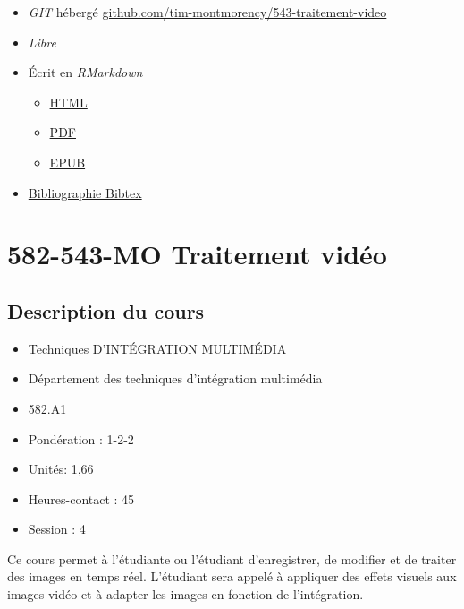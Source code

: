 \documentclass[
]{book}
\providecommand{\tightlist}{%
  \setlength{\itemsep}{0pt}\setlength{\parskip}{0pt}}
\begin{document}
\begin{itemize}
\tightlist
\item
  \emph{GIT}\citep{torvalds_Git_2006} hébergé \href{https://github.com/tim-montmorency/543-traitement-video}{github.com/tim-montmorency/543-traitement-video}
\item
  \emph{Libre}\citep{stallman_GnuOrg_1983}
\item
  Écrit en \emph{RMarkdown}\citep{allaire_RmarkdownDynamicDocuments_2020}

  \begin{itemize}
  \tightlist
  \item
    \href{https://tim-montmorency.com/543-traitement-video/}{HTML}
  \item
    \href{https://tim-montmorency.com/543-traitement-video/traitement-video.pdf}{PDF}
  \item
    \href{https://tim-montmorency.com/543-traitement-video/traitement-video.epub}{EPUB}
  \end{itemize}
\item
  \href{https://github.com/tim-montmorency/543-traitement-video/blob/master/582543-traitement-video.bib}{Bibliographie Bibtex}
\end{itemize}

\hypertarget{mo-traitement-viduxe9o}{%
\chapter{582-543-MO Traitement vidéo}\label{mo-traitement-viduxe9o}}

\hypertarget{description-du-cours}{%
\section{Description du cours}\label{description-du-cours}}

\begin{itemize}
\tightlist
\item
  Techniques D'INTÉGRATION MULTIMÉDIA
\item
  Département des techniques d'intégration multimédia
\item
  582.A1
\item
  Pondération : 1-2-2
\item
  Unités: 1,66
\item
  Heures-contact : 45
\item
  Session : 4
\end{itemize}

Ce cours permet à l'étudiante ou l'étudiant d'enregistrer, de modifier et de traiter des images en temps réel.
L'étudiant sera appelé à appliquer des effets visuels aux images vidéo et à adapter les images en fonction de l'intégration.
\end{document}
